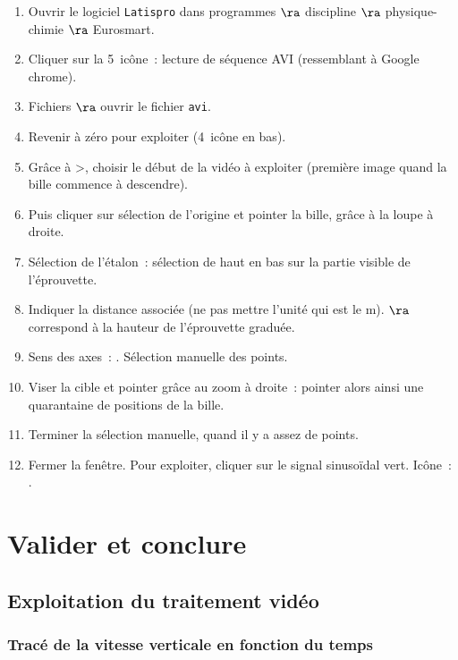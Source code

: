 \documentclass[a4paper, 11pt, final, garamond]{book}
\begin{document}
\begin{enumerate}
    \item Ouvrir le logiciel \texttt{Latispro} dans programmes $\ra$
        discipline $\ra$ physique-chimie $\ra$ Eurosmart.
    \item Cliquer sur la 5\ieme\ icône~: lecture de séquence AVI (ressemblant à
        Google chrome).
    \item Fichiers $\ra$ ouvrir le fichier \texttt{avi}.
    \item Revenir à zéro pour exploiter (4\ieme\ icône en bas).
    \item Grâce à >, choisir le début de la vidéo à exploiter (première image
        quand la bille commence à descendre).
    \item Puis cliquer sur sélection de l'origine et pointer la bille, grâce à
        la loupe à droite.
    \item Sélection de l'étalon~: sélection de haut en bas sur la partie visible
        de l'éprouvette.
    \item Indiquer la distance associée (ne pas mettre l'unité qui est le
        \si{m}). $\ra$ correspond à la hauteur de l'éprouvette graduée.
    \item Sens des axes~: \fbox{$\downarrow \ra$}. Sélection manuelle des
        points.
    \item Viser la cible et pointer grâce au zoom à droite~: pointer alors ainsi
        une quarantaine de positions de la bille.
    \item Terminer la sélection manuelle, quand il y a assez de points.
    \item Fermer la fenêtre. Pour exploiter, cliquer sur le signal sinusoïdal
        vert. Icône~: \fbox{$\sim$}.
\end{enumerate}

\section{Valider et conclure}

\subsection{Exploitation du traitement vidéo}

\subsubsection{Tracé de la vitesse verticale en fonction du temps}
\end{document}
